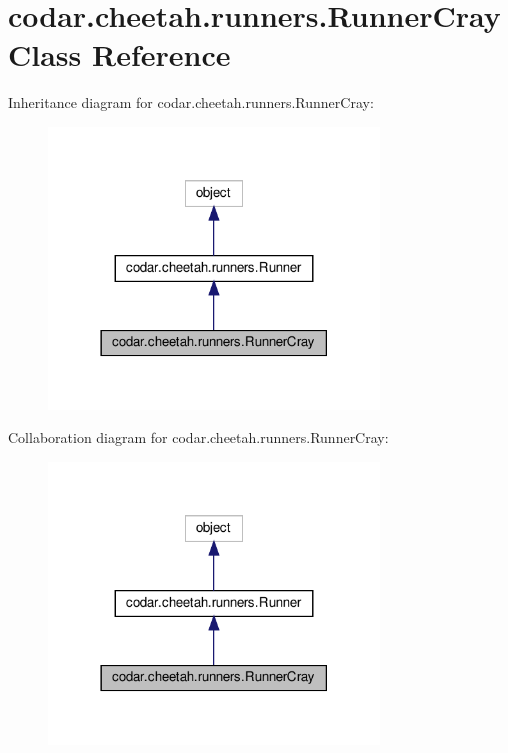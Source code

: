 \hypertarget{classcodar_1_1cheetah_1_1runners_1_1_runner_cray}{}\section{codar.\+cheetah.\+runners.\+Runner\+Cray Class Reference}
\label{classcodar_1_1cheetah_1_1runners_1_1_runner_cray}


Inheritance diagram for codar.\+cheetah.\+runners.\+Runner\+Cray\+:
\nopagebreak
\begin{figure}[H]
\begin{center}
\leavevmode
\includegraphics[width=249pt]{classcodar_1_1cheetah_1_1runners_1_1_runner_cray__inherit__graph}
\end{center}
\end{figure}


Collaboration diagram for codar.\+cheetah.\+runners.\+Runner\+Cray\+:
\nopagebreak
\begin{figure}[H]
\begin{center}
\leavevmode
\includegraphics[width=249pt]{classcodar_1_1cheetah_1_1runners_1_1_runner_cray__coll__graph}
\end{center}
\end{figure}
